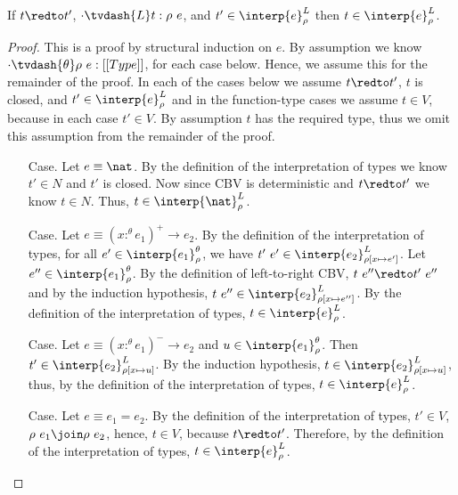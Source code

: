 \begin{lemma}[$\CRIII$]
  \label{lemma:criii}
  If $t \redto t'$, $\cdot \tvdash{L} t:\rho\ e$, and $t' \in \interp{e}^L_\rho$ 
  then $t \in \interp{e}^L_\rho$.
\end{lemma}
\begin{proof}
  This is a proof by structural induction on $e$.  
  By assumption we know $\cdot \tvdash{\theta} \rho\ e:[[Type]]$, for each case below.  Hence, we 
  assume this for the remainder of the proof.  In each of the cases below we assume
  $t \redto t'$, $t$ is closed, and $t' \in \interp{e}^L_\rho$ and in the function-type cases we 
  assume $t \in V$, because in each case $t' \in V$.  By assumption $t$ has the required type,
  thus we omit this assumption from the remainder of the proof.

  \begin{itemize}
  \item[Case.] Let $e \equiv \nat$.  
    By the definition of the interpretation of types we know
    $t' \in N$ and $t'$ is closed.  Now since CBV is deterministic and $t \redto t'$ we know
    $t \in N$.  Thus, $t \in \interp{\nat}^L_\rho$.

  \item[Case.] Let $e \equiv (x :^\theta e_1)^+ \rightarrow e_2$.    
    By the definition of the interpretation of types,
    for all $e' \in \interp{e_1}^\theta_\rho$, we have 
    $t'\ e' \in \interp{e_2}^L_{\rho[x \mapsto e']}$.
    Let $e'' \in \interp{e_1}^\theta_\rho$.  By the definition of left-to-right 
    CBV, $t\ e'' \redto t'\ e''$ and by the induction hypothesis, 
    $t\ e'' \in \interp{e_2}^L_{\rho[x \mapsto e'']}$.  By the definition of the interpretation of
    types, $t \in \interp{e}^L_{\rho}$.

  \item[Case.] Let $e \equiv (x :^\theta e_1)^- \to e_2$ and $u \in \interp{e_1}^\theta_\rho$.  
    Then $t' \in \interp{e_2}^L_{\rho[x \mapsto u]}$.  By the 
    induction hypothesis, $t \in \interp{e_2}^L_{\rho[x \mapsto u]}$, thus, by
    the definition of the interpretation of types, $t \in \interp{e}^L_\rho$.

  \item[Case.] Let $e \equiv e_1 = e_2$.
    By the definition of the interpretation of types, $t' \in V$,
    $\rho\ e_1 \join \rho\ e_2$, hence, $t \in V$, because 
    $t \redto t'$.  Therefore, 
    by the definition of the interpretation of types, $t \in \interp{e}^L_\rho$.
  \end{itemize}
\end{proof}

